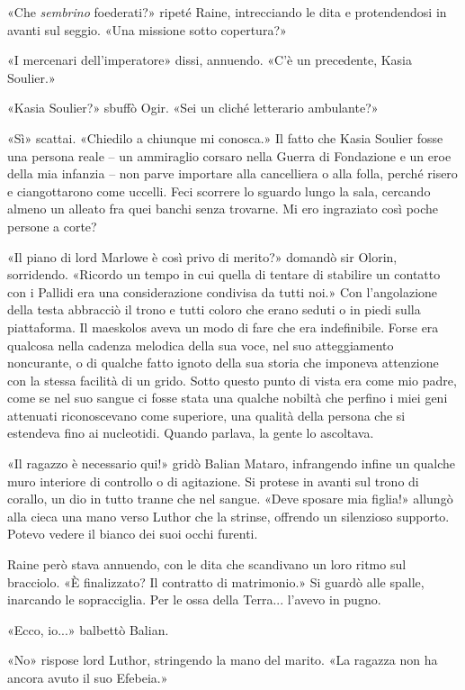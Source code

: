 «Che \emph{sembrino} foederati?» ripeté Raine, intrecciando le dita e
protendendosi in avanti sul seggio. «Una missione sotto copertura?»

«I mercenari dell'imperatore» dissi, annuendo. «C'è un precedente, Kasia
Soulier.»

«Kasia Soulier?» sbuffò Ogir. «Sei un cliché letterario ambulante?»

«Sì» scattai. «Chiedilo a chiunque mi conosca.» Il fatto che Kasia
Soulier fosse una persona reale -- un ammiraglio corsaro nella Guerra di
Fondazione e un eroe della mia infanzia -- non parve importare alla
cancelliera o alla folla, perché risero e ciangottarono come uccelli.
Feci scorrere lo sguardo lungo la sala, cercando almeno un alleato fra
quei banchi senza trovarne. Mi ero ingraziato così poche persone a
corte?

«Il piano di lord Marlowe è così privo di merito?» domandò sir Olorin,
sorridendo. «Ricordo un tempo in cui quella di tentare di stabilire un
contatto con i Pallidi era una considerazione condivisa da tutti noi.»
Con l'angolazione della testa abbracciò il trono e tutti coloro che
erano seduti o in piedi sulla piattaforma. Il maeskolos aveva un modo di
fare che era indefinibile. Forse era qualcosa nella cadenza melodica
della sua voce, nel suo atteggiamento noncurante, o di qualche fatto
ignoto della sua storia che imponeva attenzione con la stessa facilità
di un grido. Sotto questo punto di vista era come mio padre, come se nel
suo sangue ci fosse stata una qualche nobiltà che perfino i miei geni
attenuati riconoscevano come superiore, una qualità della persona che si
estendeva fino ai nucleotidi. Quando parlava, la gente lo ascoltava.

«Il ragazzo è necessario qui!» gridò Balian Mataro, infrangendo infine
un qualche muro interiore di controllo o di agitazione. Si protese in
avanti sul trono di corallo, un dio in tutto tranne che nel sangue.
«Deve sposare mia figlia!» allungò alla cieca una mano verso Luthor che
la strinse, offrendo un silenzioso supporto. Potevo vedere il bianco dei
suoi occhi furenti.

Raine però stava annuendo, con le dita che scandivano un loro ritmo sul
bracciolo. «È finalizzato? Il contratto di matrimonio.» Si guardò alle
spalle, inarcando le sopracciglia. Per le ossa della Terra... l'avevo in
pugno.

«Ecco, io...» balbettò Balian.

«No» rispose lord Luthor, stringendo la mano del marito. «La ragazza non
ha ancora avuto il suo Efebeia.»

